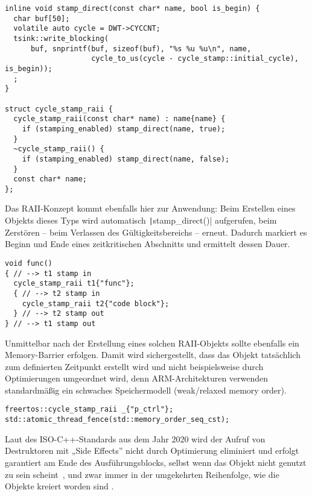 \begin{code}
\begin{verbatim}
inline void stamp_direct(const char* name, bool is_begin) {
  char buf[50];
  volatile auto cycle = DWT->CYCCNT;
  tsink::write_blocking(
      buf, snprintf(buf, sizeof(buf), "%s %u %u\n", name,
                    cycle_to_us(cycle - cycle_stamp::initial_cycle), is_begin));
  ;
}

struct cycle_stamp_raii {
  cycle_stamp_raii(const char* name) : name{name} {
    if (stamping_enabled) stamp_direct(name, true);
  }
  ~cycle_stamp_raii() {
    if (stamping_enabled) stamp_direct(name, false);
  }
  const char* name;
};
\end{verbatim}
\end{code}

Das RAII-Konzept kommt ebenfalls hier zur Anwendung: Beim Erstellen eines
Objekts dieses Typs wird automatisch \texttt|stamp_direct()|
aufgerufen, beim Zerstören -- beim Verlassen des Gültigkeitsbereichs -- erneut.
Dadurch markiert es Beginn und Ende eines zeitkritischen Abschnitts und
ermittelt dessen Dauer.

\begin{code}
\begin{verbatim}
void func()
{ // --> t1 stamp in
  cycle_stamp_raii t1{"func"};
  { // --> t2 stamp in
    cycle_stamp_raii t2{"code block"};
  } // --> t2 stamp out
} // --> t1 stamp out
\end{verbatim}
\end{code}

Unmittelbar nach der Erstellung eines solchen RAII-Objekts sollte ebenfalls ein
Memory-Barrier erfolgen. Damit wird sichergestellt, dass das Objekt tatsächlich
zum definierten Zeitpunkt erstellt wird und nicht beispielsweise durch
Optimierungen umgeordnet wird, denn ARM-Architekturen verwenden standardmäßig
ein schwaches Speichermodell (weak/relaxed memory order).

\begin{code}
\begin{verbatim}
freertos::cycle_stamp_raii _{"p_ctrl"};
std::atomic_thread_fence(std::memory_order_seq_cst);
\end{verbatim}
\end{code}

Laut des ISO-C++-Standards aus dem Jahr 2020 wird der Aufruf von Destruktoren
mit „Side Effects”\footnotemark{} nicht durch Optimierung eliminiert und erfolgt
garantiert am Ende des Ausführungsblocks, selbst wenn das Objekt nicht genutzt
zu sein scheint~\cite[§6.7.5.4 Abs. 3]{iso_iec_14882_2020}, und zwar immer in
der umgekehrten Reihenfolge, wie die Objekte kreiert worden sind
\cite{isocpp_dtor_order}.

